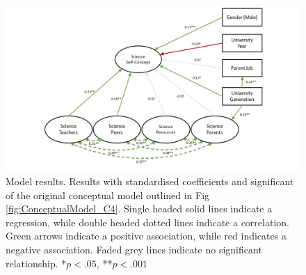 \begin{figure}
 \includegraphics[width = \linewidth]{C4 - Science Capital Self-Concept/ConceptualModel_results.jpg}
\caption{Model results. Results with standardised coefficients and significant of the original conceptual model outlined in Fig \ref{fig:ConceptualModel_C4}. Single headed solid lines indicate a regression, while double headed dotted lines indicate a correlation. Green arrows indicate a positive association, while red indicates a negative association. Faded grey lines indicate no significant relationship. *$p <.05$, **$p <.001$}
\label{fig:ConceptualModel_results_C4}       
\end{figure}


